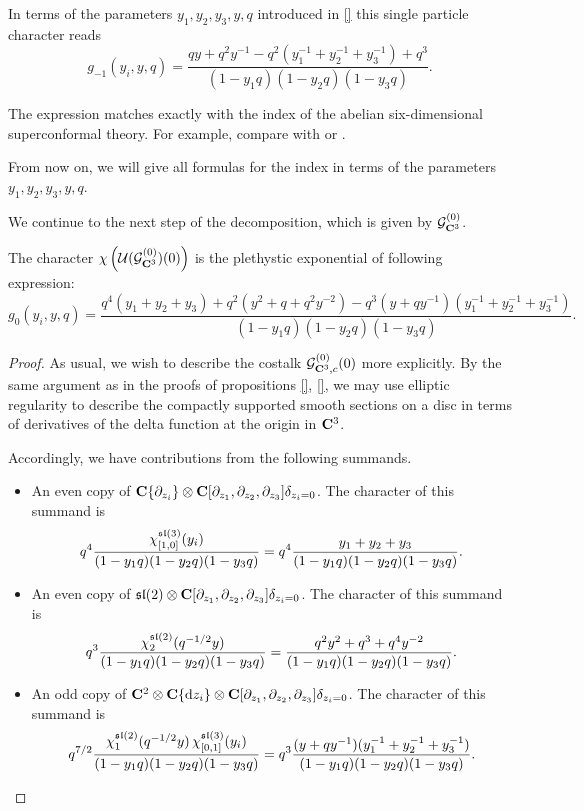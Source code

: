 \documentclass[../main.tex]{subfiles}
\begin{document}
In terms of the parameters $y_1,y_2,y_3,y,q$ introduced in \ref{} this single particle character reads
\begin{equation}
\label{eqn:6done1}
g_{-1} (y_i,y,q) = \frac{qy + q^2y^{-1} - q^2(y^{-1}_1+y^{-1}_2+y^{-1}_3) + q^3}{(1-y_1q) (1-y_2 q) (1-y_3 q)} .
\end{equation}

The expression matches exactly with the index of the abelian six-dimensional superconformal theory. For example, compare with \cite[Eq. (3.1)]{Kim:2013nva} or \cite[Eq. (3.35)]{Bhattacharya:2008zy}.

From now on, we will give all formulas for the index in terms of the parameters $y_1,y_2,y_3,y,q$.

\parsec[]
We continue to the next step of the decomposition, which is given by  $\mathcal{G}^{(0)}_{\mathbf{C}^3}$.

\begin{prop}
The character $\chi \left( \mathcal{U}(\mathcal{G}^{(0)} _{\mathbf{C}^3}) (0)\right )$  is the plethystic exponential of following expression:
\begin{equation}\label{eqn:6dtwo}
g_{0} (y_i,y,q) = \frac{q^4(y_1+y_2+y_3) + q^2 (y^2 + q + q^2 y^{-2}) - q^{3} (y + q y^{-1})(y_1^{-1} + y_2^{-1} + y_3^{-1})}{(1-y_1q) (1-y_2 q) (1-y_3 q)}.
\end{equation}
\end{prop}
\begin{proof}
As usual, we wish to describe the costalk $\mathcal{G}^{(0)}_{\mathbf{C}^3, c} (0)$  more explicitly. By the same argument as in the proofs of propositions \ref{}, \ref{}, we may use elliptic regularity to describe the compactly supported smooth sections on a disc in terms of derivatives of the delta function at the origin in $\mathbf{C}^3$. 

Accordingly, we have contributions from the following summands.
\begin{itemize}
\item An even copy of $\mathbf{C}\{\partial_{z_i} \} \otimes \mathbf{C}[\partial_{z_1}, \partial_{z_2}, \partial_{z_3}] \delta_{z_i=0}$. The character of this summand is
\[
q^4 \frac{\chi^{\mathfrak{sl}(3)}_{[1,0]}(y_i)}{(1-y_1q) (1-y_2 q) (1-y_3 q)}  = q^4 \frac{y_1 + y_2 + y_3}{(1-y_1q) (1-y_2 q) (1-y_3 q)}.
\]
\item An even copy of $\mathfrak{sl}(2) \otimes \mathbf{C}[\partial_{z_1}, \partial_{z_2}, \partial_{z_3}] \delta_{z_i=0}$. The character of this summand is
\[
q^3 \frac{\chi_2^{\mathfrak{sl}(2)} (q^{-1/2}y)}{(1-y_1q) (1-y_2 q) (1-y_3 q)}  = \frac{q^2 y^2 + q^3 + q^4 y^{-2}}{(1-y_1q) (1-y_2 q) (1-y_3 q)}.
\]
\item An odd copy of $\mathbf{C}^2\otimes \mathbf{C}\{\mathrm{d} z_i \} \otimes \mathbf{C}[\partial_{z_1}, \partial_{z_2}, \partial_{z_3}] \delta_{z_i=0}$. The character of this summand is 
\[
q^{7/2}\frac{\chi^{\mathfrak{sl}(2)}_{1}(q^{-1/2} y) \, \chi_{[0,1]}^{\mathfrak{sl}(3)} (y_i)}{(1-y_1q) (1-y_2 q) (1-y_3 q)} = q^{3}\frac{(y + q y^{-1})(y_1^{-1} + y_2^{-1} + y_3^{-1})}{(1-y_1q) (1-y_2 q) (1-y_3 q)} .
\]
\end{itemize}
\end{proof}
\end{document}
